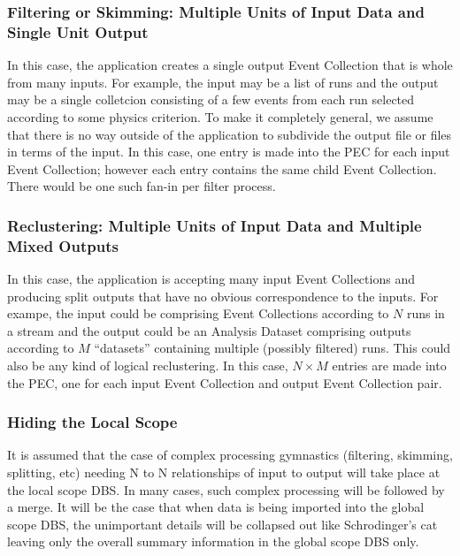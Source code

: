 \documentclass{cmspaper}
\begin{document}
{\subsubsection{Filtering or Skimming: Multiple Units of Input Data and Single 
Unit Output}

In this case, the application creates a single output Event Collection
that is whole from many inputs.  For example, the input may be a list
of runs and the output may be a single colletcion consisting of a few
events from each run selected according to some physics criterion.
To make it completely general, we assume that there is no way outside
of the application to subdivide the output file or files in terms of
the input.  In this case, one entry is made into the PEC for each input
Event Collection; however each entry contains the same child Event
Collection. There would be one such fan-in per filter process.

\subsubsection{Reclustering: Multiple Units of Input Data and Multiple Mixed Outputs}

In this case, the application is accepting many input Event Collections
and producing split outputs that have no obvious correspondence to the
inputs.  For exampe, the input could be comprising Event Collections
according to $N$ runs in a stream and the output could be an Analysis
Dataset comprising outputs according to $M$ ``datasets'' containing
multiple (possibly filtered) runs.  This could also be any kind of logical
reclustering.  In this case, $N \times M$ entries are made into the PEC,
one for each input Event Collection and output Event Collection pair.

\subsubsection{Hiding the Local Scope}

It is assumed that the case of complex processing gymnastics (filtering,
skimming, splitting, etc) needing N to N relationships of input to output
will take place at the local scope DBS.  In many cases, such complex
processing will be followed by a merge.  It will be the case that when
data is being imported into the global scope DBS, the unimportant details
will be collapsed out like Schrodinger's cat leaving only the overall
summary information in the global scope DBS only.


}
\end{document}
